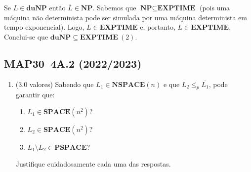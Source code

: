 \documentclass[a4paper,12pt]{article}
\begin{document}
\begin{enumerate}[label=\alph*)]
  \vspace{0.3cm}
  Se $L \in \textbf{duNP}$ então $\overline{L} \in \textbf{NP}$. Sabemos que $\textbf{NP} \subseteq \textbf{EXPTIME}$ (pois uma máquina não determinista pode ser simulada por uma máquina determinista em tempo exponencial). Logo, $\overline{L} \in \textbf{EXPTIME}$ e, portanto, $L \in \textbf{EXPTIME}$. Conclui-se que $\textbf{duNP} \subseteq \textbf{EXPTIME} \ (2)$.

\end{enumerate}

\vspace{1.0cm}
\subsection*{MAP30–4A.2 (2022/2023)}
\begin{enumerate}[label=\alph*)]
  \item (3.0 valores) Sabendo que \( L_1 \in \textbf{NSPACE}(n) \) e que \( L_2 \leq_p \overline{L_1} \), pode garantir que:
  \begin{enumerate}[label=\roman*)]
      \item \( \overline{L_1} \in \textbf{SPACE}(n^2) \)?
      \item \( L_2 \in \textbf{SPACE}(n^2) \)?
      \item \( L_1 \setminus L_2 \in \textbf{PSPACE} \)?
  \end{enumerate}
  Justifique cuidadosamente cada uma das respostas.
\end{enumerate}
\end{document}
